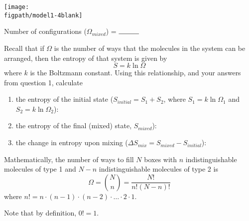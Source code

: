 \begin{activity}
\begin{ctqs}
\begin{enumerate}
\begin{solution}
{\centerline{\texttt{[image: \\figpath/model1-4blank]}}

						\vspace{0.1in}
						\centerline{Number of configurations ($\Omega_{mixed}$) = $\rule{1cm}{0.15mm}$}
					}
				\end{solution}
		\end{enumerate}
		
	\question Recall that if $\Omega$ is the number of ways that the molecules in the system can be arranged, then the entropy of that system is given by
		\begin{equation*}
			S = k \ln \Omega
		\end{equation*} 
		where $k$ is the Boltzmann constant.  Using this relationship, and your answers from question 1, calculate
			
		\begin{enumerate}
			\item the entropy of the initial state ($S_{initial} = S_1 + S_2$, where $S_1 = k\ln \Omega_1$ and $S_2 = k \ln \Omega_2$):
				\begin{solution}[1.25in]
				\end{solution}
			\item the entropy of the final (mixed) state, $S_{mixed}$):
				\begin{solution}[1in]
				\end{solution}
			\item the change in entropy upon mixing ($\Delta S_{mix} = S_{mixed} - S_{initial}$): 
				\begin{solution}[1in]
				\end{solution}
		\end{enumerate}
		
\end{ctqs}

\begin{infobox}
	Mathematically, the number of ways to fill $N$ boxes with $n$ indistinguishable molecules of type 1 and $N-n$ indistinguishable molecules of type 2 is
	\begin{equation*}
		\Omega = {N \choose n} = \frac{N!}{n!(N-n)!}
	\end{equation*}
	where $n! = n\cdot(n-1)\cdot(n-2)\cdot\dots\cdot 2 \cdot 1$.
	
	Note that by definition, $0!=1$.
\end{infobox}

\vspace{0.05in}
\begin{ctqs}
		

\end{ctqs}
\end{activity}
